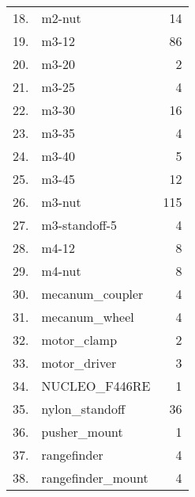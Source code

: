 \begin{longtable}{clr}
	18.       & m2-nut                                  & 14                       \\ 
	19.       & m3-12                                   & 86                       \\ 
	20.       & m3-20                                   & 2                        \\ 
	21.       & m3-25                                   & 4                        \\ 
	22.       & m3-30                                   & 16                       \\ 
	23.       & m3-35                                   & 4                        \\ 
	24.       & m3-40                                   & 5                        \\ 
	25.       & m3-45                                   & 12                       \\ 
	26.       & m3-nut                                  & 115                      \\ 
	27.       & m3-standoff-5                           & 4                        \\ 
	28.       & m4-12                                   & 8                        \\ 
	29.       & m4-nut                                  & 8                        \\ 
	30.       & mecanum\_coupler                        & 4                        \\ 
	31.       & mecanum\_wheel                          & 4                        \\ 
	32.       & motor\_clamp                            & 2                        \\ 
	33.       & motor\_driver                           & 3                        \\ 
	34.       & NUCLEO\_F446RE                          & 1                        \\ 
	35.       & nylon\_standoff                         & 36                       \\ 
	36.       & pusher\_mount                           & 1                        \\ 
	37.       & rangefinder                             & 4                        \\ 
	38.       & rangefinder\_mount                      & 4                        \\ 

\end{longtable}
